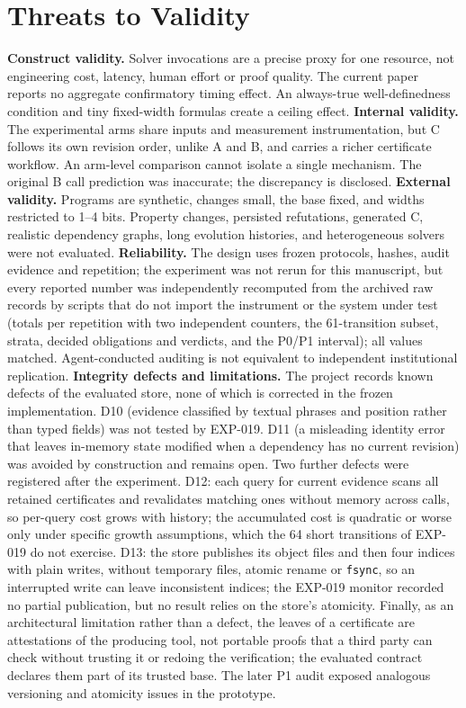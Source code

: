 \documentclass[10pt,twocolumn]{article}
\begin{document}
\section{Threats to Validity}\label{sec:threats}
\textbf{Construct validity.} Solver invocations are a precise proxy for one resource, not engineering cost, latency, human effort or proof quality. The current paper reports no aggregate confirmatory timing effect. An always-true well-definedness condition and tiny fixed-width formulas create a ceiling effect. \textbf{Internal validity.} The experimental arms share inputs and measurement instrumentation, but C follows its own revision order, unlike A and B, and carries a richer certificate workflow. An arm-level comparison cannot isolate a single mechanism. The original B call prediction was inaccurate; the discrepancy is disclosed. \textbf{External validity.} Programs are synthetic, changes small, the base fixed, and widths restricted to 1--4 bits. Property changes, persisted refutations, generated C, realistic dependency graphs, long evolution histories, and heterogeneous solvers were not evaluated. \textbf{Reliability.} The design uses frozen protocols, hashes, audit evidence and repetition; the experiment was not rerun for this manuscript, but every reported number was independently recomputed from the archived raw records by scripts that do not import the instrument or the system under test (totals per repetition with two independent counters, the 61-transition subset, strata, decided obligations and verdicts, and the P0/P1 interval); all values matched. Agent-conducted auditing is not equivalent to independent institutional replication. \textbf{Integrity defects and limitations.} The project records known defects of the evaluated store, none of which is corrected in the frozen implementation. D10 (evidence classified by textual phrases and position rather than typed fields) was not tested by EXP-019. D11 (a misleading identity error that leaves in-memory state modified when a dependency has no current revision) was avoided by construction and remains open. Two further defects were registered after the experiment. D12: each query for current evidence scans all retained certificates and revalidates matching ones without memory across calls, so per-query cost grows with history; the accumulated cost is quadratic or worse only under specific growth assumptions, which the 64 short transitions of EXP-019 do not exercise. D13: the store publishes its object files and then four indices with plain writes, without temporary files, atomic rename or \texttt{fsync}, so an interrupted write can leave inconsistent indices; the EXP-019 monitor recorded no partial publication, but no result relies on the store's atomicity. Finally, as an architectural limitation rather than a defect, the leaves of a certificate are attestations of the producing tool, not portable proofs that a third party can check without trusting it or redoing the verification; the evaluated contract declares them part of its trusted base. The later P1 audit exposed analogous versioning and atomicity issues in the prototype.
\end{document}
